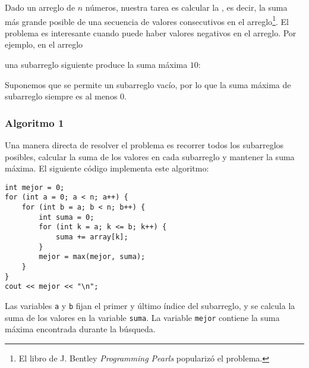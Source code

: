 Dado un arreglo de $n$ números,
nuestra tarea es calcular la
, es decir,
la suma más grande posible de
una secuencia de valores consecutivos
en el arreglo\footnote{El libro de J. Bentley \emph{Programming Pearls} \cite{ben86} popularizó el problema.}.
El problema es interesante cuando puede haber
valores negativos en el arreglo.
Por ejemplo, en el arreglo
\begin{center}
\end{center}
una subarreglo siguiente produce la suma máxima $10$:
\begin{center}
\end{center}

Suponemos que se permite un subarreglo vacío,
por lo que la suma máxima de subarreglo siempre es al menos $0$.

\subsubsection{Algoritmo 1}

Una manera directa de resolver el problema
es recorrer todos los subarreglos posibles,
calcular la suma de los valores en cada subarreglo y mantener
la suma máxima.
El siguiente código implementa este algoritmo:

\begin{lstlisting}
int mejor = 0;
for (int a = 0; a < n; a++) {
    for (int b = a; b < n; b++) {
        int suma = 0;
        for (int k = a; k <= b; k++) {
            suma += array[k];
        }
        mejor = max(mejor, suma);
    }
}
cout << mejor << "\n";
\end{lstlisting}

Las variables \texttt{a} y \texttt{b} fijan el primer y
último índice del subarreglo,
y se calcula la suma de los valores en la variable \texttt{suma}.
La variable \texttt{mejor} contiene la suma máxima encontrada durante la búsqueda.


